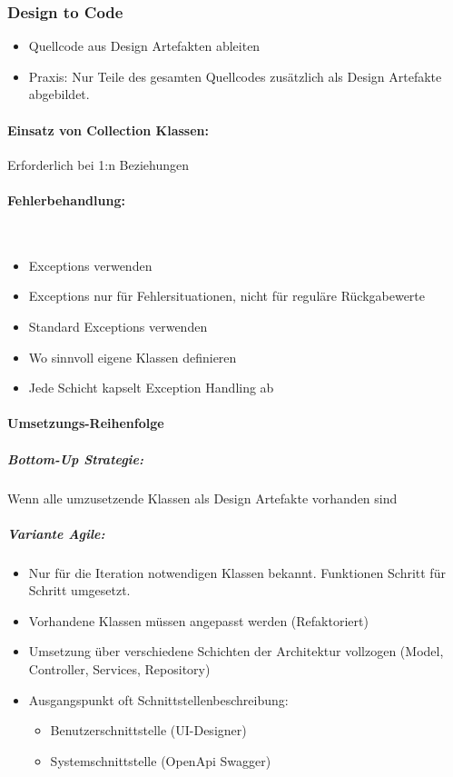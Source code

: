\documentclass[../ZF_SWEN1.tex]{subfiles}
\begin{document}
\subsubsection{Design to Code}
\begin{itemize}
	\item Quellcode aus Design Artefakten ableiten
	\item Praxis: Nur Teile des gesamten Quellcodes zusätzlich als Design Artefakte abgebildet.
\end{itemize}

\paragraph{Einsatz von Collection Klassen:} Erforderlich bei 1:n Beziehungen

\paragraph{Fehlerbehandlung:}\\
\begin{itemize}
	\item Exceptions verwenden
	\item Exceptions nur für Fehlersituationen, nicht für reguläre Rückgabewerte
	\item Standard Exceptions verwenden
	\item Wo sinnvoll eigene Klassen definieren
	\item Jede Schicht kapselt Exception Handling ab
\end{itemize}


\paragraph{Umsetzungs-Reihenfolge}
\subparagraph{Bottom-Up Strategie:}
Wenn alle umzusetzende Klassen als Design Artefakte vorhanden sind

\subparagraph{Variante Agile:}
\begin{itemize}
	\item Nur für die Iteration notwendigen Klassen bekannt. Funktionen Schritt für Schritt umgesetzt.
	\item Vorhandene Klassen müssen angepasst werden (Refaktoriert)
	\item Umsetzung über verschiedene Schichten der Architektur vollzogen (Model, Controller, Services, Repository)
	\item Ausgangspunkt oft Schnittstellenbeschreibung:
	\begin{itemize}
		\item Benutzerschnittstelle (UI-Designer)
		\item Systemschnittstelle (OpenApi Swagger)
	\end{itemize}
\end{itemize}
\end{document}
